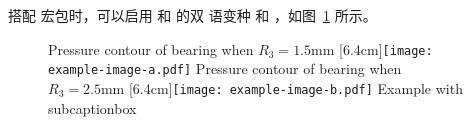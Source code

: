 搭配  宏包时，可以启用  和  的双
语变种  和 ，如图~\ref{fig:bisubcaptionbox}
所示。

\begin{figure}[!hbtp]
  \centering
                  {Pressure contour of bearing when $R_3 = 1.5\text{mm}$}%
                  [6.4cm]{\texttt{[image: example-image-a.pdf]}}
  \hspace{1cm}
                  {Pressure contour of bearing when $R_3 = 2.5\text{mm}$}%
                  [6.4cm]{\texttt{[image: example-image-b.pdf]}}
            {Example with subcaptionbox}
  \label{fig:bisubcaptionbox}
\end{figure}







